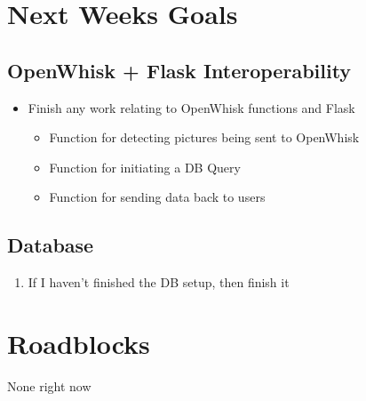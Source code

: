 \documentclass[paper=a4, fontsize=12pt]{scrartcl} %
\numberwithin{equation}{section} %
\numberwithin{figure}{section} %
\numberwithin{table}{section} %
\begin{document}


\section{Next Weeks Goals}


\subsection{OpenWhisk + Flask Interoperability}
\begin{itemize}
	\item Finish any work relating to OpenWhisk functions and Flask 
		\begin{itemize}
		\item Function for detecting pictures being sent to OpenWhisk 
		\item Function for initiating a DB Query
        \item Function for sending data back to users
		\end{itemize} 
\end{itemize}


\subsection{Database}
\begin{enumerate}
\item If I haven't finished the DB setup, then finish it 
\end{enumerate}



\section{Roadblocks}


None right now
\end{document}
